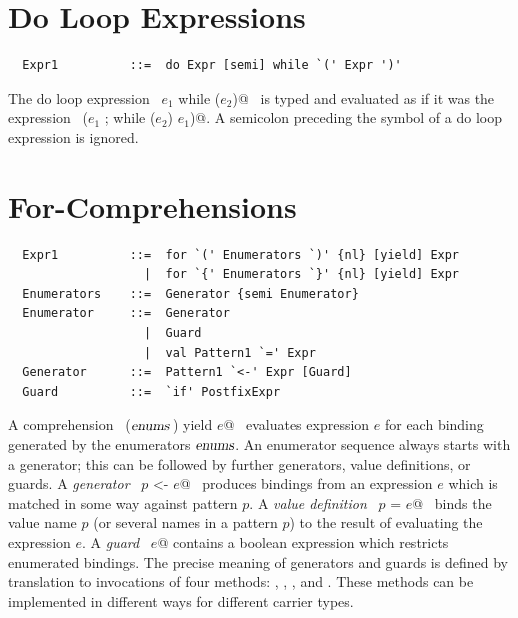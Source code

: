 
\section{Do Loop Expressions}

\syntax\begin{lstlisting}
  Expr1          ::=  do Expr [semi] while `(' Expr ')'
\end{lstlisting}

The do loop expression ~\lstinline@do $e_1$ while ($e_2$)@~ is typed and
evaluated as if it was the expression ~\lstinline@($e_1$ ; while ($e_2$) $e_1$)@.
A semicolon preceding the  symbol of a do loop expression is ignored.

\section{For-Comprehensions}\label{sec:for-comprehensions}

\syntax\begin{lstlisting}
  Expr1          ::=  for `(' Enumerators `)' {nl} [yield] Expr
                   |  for `{' Enumerators `}' {nl} [yield] Expr
  Enumerators    ::=  Generator {semi Enumerator}
  Enumerator     ::=  Generator 
                   |  Guard
                   |  val Pattern1 `=' Expr
  Generator      ::=  Pattern1 `<-' Expr [Guard]
  Guard          ::=  `if' PostfixExpr
\end{lstlisting}

A comprehension ~\lstinline@for ($\mbox{\sl enums}\,$) yield $e$@~ evaluates
expression $e$ for each binding generated by the enumerators
$\mbox{\sl enums}$. An enumerator sequence always starts with a generator; this
can be followed by further generators, value definitions, or guards.
A {\em generator} ~\lstinline@$p$ <- $e$@~ produces bindings from
an expression $e$ which is matched in some way against pattern $p$. A
{\em value definition} ~\lstinline@val $p$ = $e$@~ binds the value
name $p$ (or several names in a pattern $p$) to the result of
evaluating the expression $e$. 
A {\em guard} ~\lstinline@if $e$@ contains a boolean expression 
which restricts enumerated bindings. The precise meaning
of generators and guards is defined by translation to invocations of
four methods: , , , and
. These methods can be implemented in different ways for
different carrier types.  

